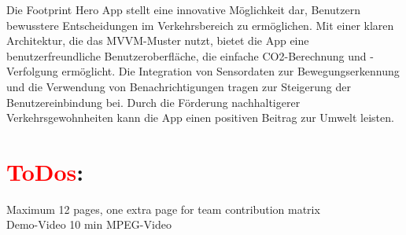 \documentclass{article}
\begin{document}
Die Footprint Hero App stellt eine innovative Möglichkeit dar, Benutzern bewusstere Entscheidungen im Verkehrsbereich zu ermöglichen. Mit einer klaren Architektur, die das MVVM-Muster nutzt, bietet die App eine benutzerfreundliche Benutzeroberfläche, die einfache CO2-Berechnung und -Verfolgung ermöglicht. Die Integration von Sensordaten zur Bewegungserkennung und die Verwendung von Benachrichtigungen tragen zur Steigerung der Benutzereinbindung bei. Durch die Förderung nachhaltigerer Verkehrsgewohnheiten kann die App einen positiven Beitrag zur Umwelt leisten.


\section{\textcolor{red}{ToDos}:}
Maximum 12 pages, one extra page for team contribution matrix\\
Demo-Video 10 min MPEG-Video\\
\end{document}
